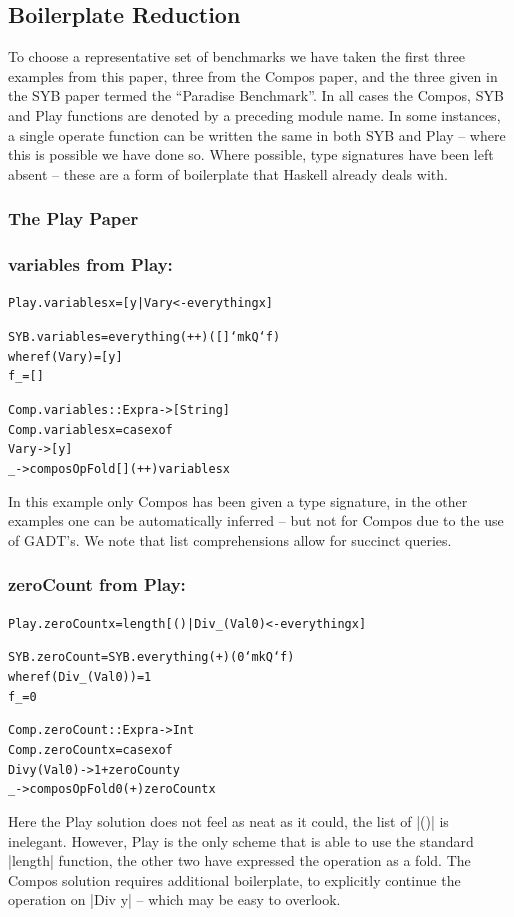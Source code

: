 \documentclass[preprint]{sigplanconf}
\newenvironment{code}{\begin{alltt}\small}{\end{alltt}}
\newcommand{\compare}[2]{\subsubsection*{\textsf{#1} from #2:}\vspace{-1ex}}
\begin{document}
\subsection{Boilerplate Reduction}

To choose a representative set of benchmarks we have taken the first three examples from this paper, three from the Compos paper, and the three given in the SYB paper termed the ``Paradise Benchmark''. In all cases the Compos, SYB and Play functions are denoted by a preceding module name. In some instances, a single operate function can be written the same in both SYB and Play -- where this is possible we have done so. Where possible, type signatures have been left absent -- these are a form of boilerplate that Haskell already deals with.

\subsubsection{The Play Paper}

\compare{variables}{Play}

\begin{code}
Play.variables x = [y | Var y <- everything x]

SYB.variables = everything (++) ([] `mkQ` f)
    where  f (Var y)  = [y]
           f _        = []

Comp.variables :: Expr a -> [String]
Comp.variables x = case x of
    Var y -> [y]
    _ -> composOpFold [] (++) variables x
\end{code}

In this example only Compos has been given a type signature, in the other examples one can be automatically inferred -- but not for Compos due to the use of GADT's. We note that list comprehensions allow for succinct queries.

\compare{zeroCount}{Play}

\begin{code}
Play.zeroCount x = length [() | Div _ (Val 0) <- everything x]

SYB.zeroCount = SYB.everything (+) (0 `mkQ` f)
    where  f (Div _ (Val 0))  = 1
           f _                = 0

Comp.zeroCount :: Expr a -> Int
Comp.zeroCount x = case x of
    Div y (Val 0) -> 1 + zeroCount y
    _ -> composOpFold 0 (+) zeroCount x
\end{code}

Here the Play solution does not feel as neat as it could, the list of |()| is inelegant. However, Play is the only scheme that is able to use the standard |length| function, the other two have expressed the operation as a fold. The Compos solution requires additional boilerplate, to explicitly continue the operation on |Div y| -- which may be easy to overlook.
\end{document}
